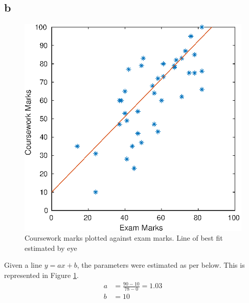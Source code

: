\subsection{b}
\begin{figure}[h]
	\includegraphics[scale=0.8, center]{./eps/topic1_b.eps}
	\caption{Coursework marks plotted against exam marks. Line of best fit estimated by eye}
	\label{fig:Topic1-b}
\end{figure}
Given a line $y=ax+b$, the parameters were estimated as per below. This is represented in Figure \ref{fig:Topic1-b}.
\begin{equation}
\begin{split}
	a &= \frac{90-10}{78-0} = 1.03 \\
	b &= 10
\end{split}
\end{equation}

\pagebreak

